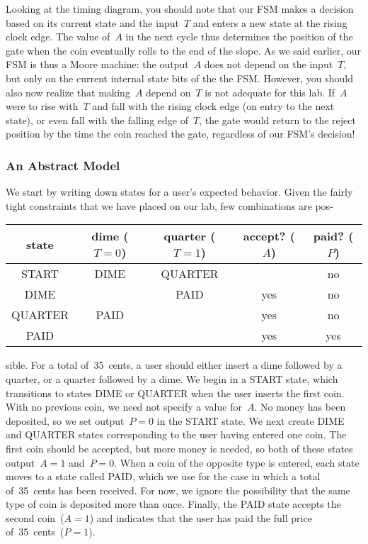 Looking at the timing diagram, you should note that our FSM makes 
a decision based on its current state and the input~$T$ and enters a 
new state at the rising clock edge.  The value of~$A$ in the next cycle
thus determines the position of the gate when the coin eventually
rolls to the end of the slope.
%
As we said earlier, our FSM is thus a Moore machine: the output~$A$
does not depend on the input~$T$, but only on the current internal 
state bits of the the FSM.
%
However, you should also now realize that making~$A$ depend on~$T$
is not adequate for this lab.  If~$A$ were to rise with~$T$ and
fall with the rising clock edge (on entry to the next state), or
even fall with the falling edge of~$T$, the gate would return to the
reject position by the time the coin reached the gate, regardless
of our FSM's decision!\\

\subsubsection{An Abstract Model}\vspace{4pt}

\begin{minipage}{1.60in}
We start by writing down states for a user's expected behavior.
Given the fairly tight constraints that we have placed on our lab,
few combinations are pos-\linebreak
\end{minipage}\hspace{0.25in}%
\begin{minipage}{4.65in}
\begin{tabular}{c|cc|cc}
state& dime ($T=0$)& quarter ($T=1$)& accept? ($A$)& paid? ($P$)\\ \hline
START& DIME& QUARTER& & no\\
DIME& & PAID& yes& no\\
QUARTER& PAID& & yes& no\\
PAID& & & yes& yes
\end{tabular}\vspace{12pt}
\end{minipage}\mpdone

sible.  For a total of~35~cents, a user should either insert a dime 
followed by a quarter, or a quarter followed by a dime.
%
We begin in a START state, which transitions to states DIME or QUARTER
when the user inserts the first coin.  With no previous coin, we need not
specify a value for~$A$.  No money has been deposited, so we set 
output~$P=0$ in the START state.
%
We next create DIME and QUARTER states corresponding to the user having
entered one coin.  The first coin should be accepted, but more money is
needed, so both of these states output~$A=1$ and~$P=0$.
When a coin of the opposite type is entered, each state moves to a
state called PAID, which we use for the case in which a total of~35~cents has
been received.  For now, we ignore the possibility that the same type
of coin is deposited more than once.  Finally, the PAID state accepts
the second coin~($A=1$) and indicates that the user has paid the full
price of~35~cents~($P=1$).

